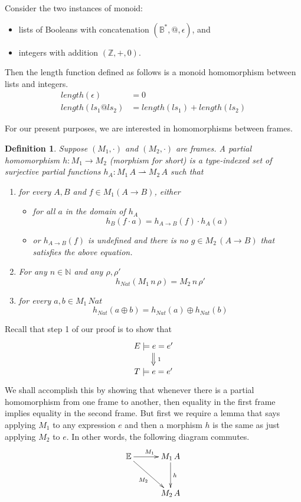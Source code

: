 \documentclass{tufte-handout}
\newcommand{\NATTY}[0]{\mathit{Nat}}
\newtheorem{definition}{Definition}%
\begin{document}
Consider the two instances of monoid:
\begin{itemize}
  \item lists of Booleans with concatenation $(\mathbb{B}^{*}, @,
    \epsilon)$, and
  \item integers with addition $(\mathbb{Z}, +, 0)$.
\end{itemize}
Then the length function defined as follows is a monoid homomorphism
between lists and integers.
\begin{align*}
  \mathit{length}(\epsilon) &= 0 \\
  \mathit{length}(ls_1 @ ls_2) &= \mathit{length}(ls_1) + \mathit{length}(ls_2)
\end{align*}

For our present purposes, we are interested in homomorphisms between
frames.

\begin{definition}
  Suppose $(M_1,\cdot)$ and $(M_2,\cdot)$ are frames.  A \emph{partial
    homomorphism} $h : M_1 \to M_2$ (morphism for short) is a
  type-indexed set of surjective partial functions $h_A : M_1\,A
  \rightharpoonup M_2\,A$ such that
  \begin{enumerate}
  \item for every $A,B$ and $f \in M_1(A \to B)$,
    either
    \begin{itemize}
    \item for all $a$ in the domain of $h_A$
      \[
      h_B( f \cdot a ) = h_{A\to B}(f) \cdot h_A(a)
      \]
      
    \item or $h_{A\to B}(f)$ is undefined and there is no $g \in
      M_2\,(A\to B)$ that satisfies the above equation.
    \end{itemize}
  \item For any $n \in \mathbb{N}$ and any $\rho,\rho'$
    \[
      h_{\NATTY}(M_1\,n\,\rho) = M_2\,n\,\rho'
    \]
  \item for every $a,b \in M_1\,\NATTY$
    \[
    h_{\NATTY}(a \oplus b) = h_{\NATTY}(a) \oplus h_{\NATTY}(b)
    \]
  \end{enumerate}
\end{definition}

Recall that step 1 of our proof is to show that
\[
\xymatrix@=15pt{
  E \models e = e' \ar@{=>}[d]^{\;1} \\
  T \models e = e'
}
\]
We shall accomplish this by showing that whenever there is a partial
homomorphism from one frame to another, then equality in the first
frame implies equality in the second frame.  But first we require a
lemma that says applying $M_1$ to any expression $e$ and then a
morphism $h$ is the same as just applying $M_2$ to $e$. In other
words, the following diagram commutes.
\[
\xymatrix@=30pt{
  \mathbb{E} \ar[r]^{M_1}\ar[dr]_{M_2} & M_1\,A \ar[d]^{h}\\
   & M_2\,A
}
\]
\end{document}
